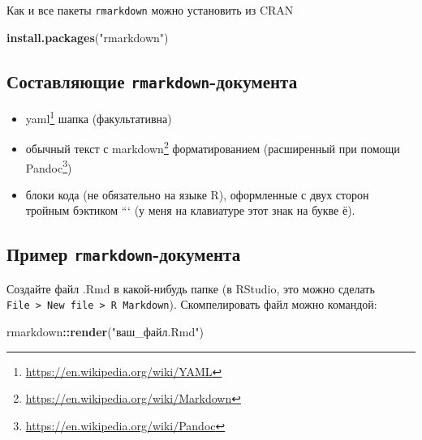 \documentclass[
]{book}
\newenvironment{Shaded}{\begin{snugshade}}{\end{snugshade}}
\newcommand{\KeywordTok}[1]{\textcolor[rgb]{0.13,0.29,0.53}{\textbf{#1}}}
\newcommand{\NormalTok}[1]{#1}
\newcommand{\OperatorTok}[1]{\textcolor[rgb]{0.81,0.36,0.00}{\textbf{#1}}}
\newcommand{\StringTok}[1]{\textcolor[rgb]{0.31,0.60,0.02}{#1}}
\providecommand{\tightlist}{%
  \setlength{\itemsep}{0pt}\setlength{\parskip}{0pt}}
\renewcommand{\href}[2]{#2\footnote{\url{#1}}}
\begin{document}
Как и все пакеты \texttt{rmarkdown} можно установить из CRAN

\begin{Shaded}
\begin{Highlighting}[]
\KeywordTok{install.packages}\NormalTok{(}\StringTok{"rmarkdown"}\NormalTok{)}
\end{Highlighting}
\end{Shaded}

\hypertarget{ux441ux43eux441ux442ux430ux432ux43bux44fux44eux449ux438ux435-rmarkdown-ux434ux43eux43aux443ux43cux435ux43dux442ux430}{%
\subsection{\texorpdfstring{Составляющие \texttt{rmarkdown}-документа}{Составляющие rmarkdown-документа}}\label{ux441ux43eux441ux442ux430ux432ux43bux44fux44eux449ux438ux435-rmarkdown-ux434ux43eux43aux443ux43cux435ux43dux442ux430}}

\begin{itemize}
\tightlist
\item
  \href{https://en.wikipedia.org/wiki/YAML}{yaml} шапка (факультативна)
\item
  обычный текст с \href{https://en.wikipedia.org/wiki/Markdown}{markdown} форматированием (расширенный при помощи \href{https://en.wikipedia.org/wiki/Pandoc}{Pandoc})
\item
  блоки кода (не обязательно на языке R), оформленные с двух сторон тройным бэктиком ``` (у меня на клавиатуре этот знак на букве ё).
\end{itemize}

\hypertarget{ux43fux440ux438ux43cux435ux440-rmarkdown-ux434ux43eux43aux443ux43cux435ux43dux442ux430}{%
\subsection{\texorpdfstring{Пример \texttt{rmarkdown}-документа}{Пример rmarkdown-документа}}\label{ux43fux440ux438ux43cux435ux440-rmarkdown-ux434ux43eux43aux443ux43cux435ux43dux442ux430}}

Создайте файл .Rmd в какой-нибудь папке (в RStudio, это можно сделать \texttt{File\ \textgreater{}\ New\ file\ \textgreater{}\ R\ Markdown}). Скомпелировать файл можно командой:

\begin{Shaded}
\begin{Highlighting}[]
\NormalTok{rmarkdown}\OperatorTok{::}\KeywordTok{render}\NormalTok{(}\StringTok{"ваш_файл.Rmd"}\NormalTok{)}
\end{Highlighting}
\end{Shaded}
\end{document}
